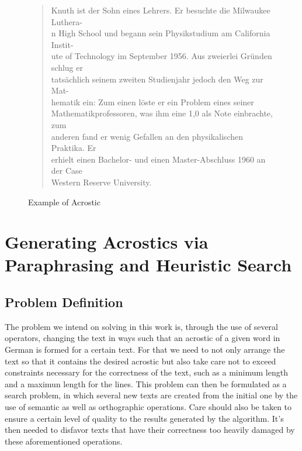 \documentclass[11pt]{reportAlternative}
\begin{document}
\begin{figure}[H]
	\begin{quote}
 Knuth ist der Sohn eines Lehrers. Er besuchte die Milwaukee Luthera- \\
	n High School und begann sein Physikstudium am California Instit- \\
	ute of Technology im September 1956. Aus zweierlei Gründen schlug er \\
	tatsächlich seinem zweiten Studienjahr jedoch den Weg zur Mat-\\
	hematik ein: Zum einen löste er ein Problem eines seiner \\
	Mathematikprofessoren, was ihm eine 1,0 als Note einbrachte, zum \\
	anderen fand er wenig Gefallen an den physikalischen Praktika. Er \\
	erhielt einen Bachelor- und einen Master-Abschluss 1960 an der Case \\
	Western Reserve University. 

	\end{quote}
	\caption{Example of Acrostic}
\end{figure}

\chapter{Generating Acrostics via Paraphrasing and Heuristic Search}

\section{Problem Definition}
The problem we intend on solving in this work is, through the use of several operators, changing the text in ways such that an acrostic of a given word in German is formed for a certain text. For that we need to not only arrange the text so that it contains the desired acrostic but also take care not to exceed constraints necessary for the correctness of the text, such as a minimum length and a maximun length for the lines. This problem can then be formulated as a search problem, in which several new texts are created from the initial one by the use of semantic as well as orthographic operations.  Care should also be taken to ensure a certain level of quality to the results generated by the algorithm. It's then needed to disfavor texts that have their correctness too heavily damaged by these aforementioned operations.
\end{document}
